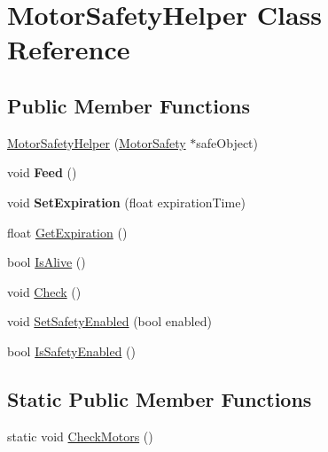 \hypertarget{classMotorSafetyHelper}{\section{\-Motor\-Safety\-Helper \-Class \-Reference}
\label{classMotorSafetyHelper}
}
\subsection*{\-Public \-Member \-Functions}
\begin{DoxyCompactItemize}
\item 
\hyperlink{classMotorSafetyHelper_ad125be744ff4ee41557c3bfedcfc8d8f}{\-Motor\-Safety\-Helper} (\hyperlink{classMotorSafety}{\-Motor\-Safety} $\ast$safe\-Object)
\item 
\hypertarget{classMotorSafetyHelper_a67b80e9817dc725e0678de5e8f0bb39e}{void {\bfseries \-Feed} ()}\label{classMotorSafetyHelper_a67b80e9817dc725e0678de5e8f0bb39e}

\item 
\hypertarget{classMotorSafetyHelper_a7b41cb1bf51aa167d97a82691ac94f81}{void {\bfseries \-Set\-Expiration} (float expiration\-Time)}\label{classMotorSafetyHelper_a7b41cb1bf51aa167d97a82691ac94f81}

\item 
float \hyperlink{classMotorSafetyHelper_abd3c09d75c252406d43deed9e83234f5}{\-Get\-Expiration} ()
\item 
bool \hyperlink{classMotorSafetyHelper_a3d4d90d4f7bc0d76445a55e5ea1d75e8}{\-Is\-Alive} ()
\item 
void \hyperlink{classMotorSafetyHelper_a951390af947b507a299d1175b7e717cf}{\-Check} ()
\item 
void \hyperlink{classMotorSafetyHelper_ad3904b781b0d4e88aba0e9a93995b122}{\-Set\-Safety\-Enabled} (bool enabled)
\item 
bool \hyperlink{classMotorSafetyHelper_af038daa6b107e8b4ef604497d451ce07}{\-Is\-Safety\-Enabled} ()
\end{DoxyCompactItemize}
\subsection*{\-Static \-Public \-Member \-Functions}
\begin{DoxyCompactItemize}
\item 
static void \hyperlink{classMotorSafetyHelper_a38fbee9c862dfb1b5bc2f1a1542eed56}{\-Check\-Motors} ()
\end{DoxyCompactItemize}


